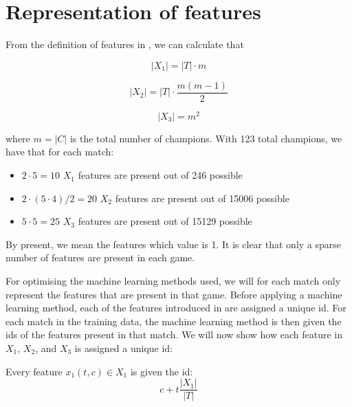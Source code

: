 
\section{Representation of features}
\label{sec:representationoffeatures}
From the definition of features in , we can calculate that

\[|X_1| = |T| \cdot m \]

\[|X_2| = |T| \cdot \frac{m(m-1)}{2} \]

\[|X_3| = m^2  \]

where $m = |C|$ is the total number of champions. With 123 total champions, we have that for each match:
\begin{itemize}
\item $2 \cdot 5 = 10$ $X_1$ features are present out of 246 possible
\item $2 \cdot (5 \cdot 4)/2 = 20$ $X_2$ features are present out of 15006 possible
\item $5 \cdot 5 = 25$ $X_3$ features are present out of 15129 possible
\end{itemize}

By present, we mean the features which value is 1.
It is clear that only a sparse number of features are present in each game. 

For optimising the machine learning methods used, we will for each match only represent the features that are present in that game. 
Before applying a machine learning method, each of the features introduced in  are assigned a unique id.
For each match in the training data, the machine learning method is then given the ids of the features present in that match.
We will now show how each feature in $X_1$, $X_2$, and $X_3$ is assigned a unique id:

\begin{center}
Every feature $x_1(t, c) \in X_1$ is given the id:
\[ c + t \frac{|X_1|}{|T|} \]
\end{center}

